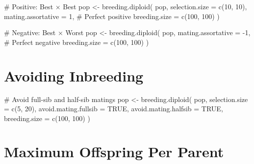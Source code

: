 \documentclass[
  letterpaper,
]{book}
\newenvironment{Shaded}{\begin{snugshade}}{\end{snugshade}}
\newcommand{\AttributeTok}[1]{\textcolor[rgb]{0.40,0.45,0.13}{#1}}
\newcommand{\CommentTok}[1]{\textcolor[rgb]{0.37,0.37,0.37}{#1}}
\newcommand{\ConstantTok}[1]{\textcolor[rgb]{0.56,0.35,0.01}{#1}}
\newcommand{\DecValTok}[1]{\textcolor[rgb]{0.68,0.00,0.00}{#1}}
\newcommand{\FunctionTok}[1]{\textcolor[rgb]{0.28,0.35,0.67}{#1}}
\newcommand{\NormalTok}[1]{\textcolor[rgb]{0.00,0.23,0.31}{#1}}
\newcommand{\OtherTok}[1]{\textcolor[rgb]{0.00,0.23,0.31}{#1}}
\newcommand{\SpecialCharTok}[1]{\textcolor[rgb]{0.37,0.37,0.37}{#1}}
\begin{document}
\begin{Shaded}
\begin{Highlighting}[]
\CommentTok{\# Positive: Best × Best}
\NormalTok{pop }\OtherTok{\textless{}{-}} \FunctionTok{breeding.diploid}\NormalTok{(}
\NormalTok{  pop,}
  \AttributeTok{selection.size =} \FunctionTok{c}\NormalTok{(}\DecValTok{10}\NormalTok{, }\DecValTok{10}\NormalTok{),}
  \AttributeTok{mating.assortative =} \DecValTok{1}\NormalTok{,        }\CommentTok{\# Perfect positive}
  \AttributeTok{breeding.size =} \FunctionTok{c}\NormalTok{(}\DecValTok{100}\NormalTok{, }\DecValTok{100}\NormalTok{)}
\NormalTok{)}

\CommentTok{\# Negative: Best × Worst}
\NormalTok{pop }\OtherTok{\textless{}{-}} \FunctionTok{breeding.diploid}\NormalTok{(}
\NormalTok{  pop,}
  \AttributeTok{mating.assortative =} \SpecialCharTok{{-}}\DecValTok{1}\NormalTok{,       }\CommentTok{\# Perfect negative}
  \AttributeTok{breeding.size =} \FunctionTok{c}\NormalTok{(}\DecValTok{100}\NormalTok{, }\DecValTok{100}\NormalTok{)}
\NormalTok{)}
\end{Highlighting}
\end{Shaded}

\section{Avoiding Inbreeding}\label{avoiding-inbreeding}

\begin{Shaded}
\begin{Highlighting}[]
\CommentTok{\# Avoid full{-}sib and half{-}sib matings}
\NormalTok{pop }\OtherTok{\textless{}{-}} \FunctionTok{breeding.diploid}\NormalTok{(}
\NormalTok{  pop,}
  \AttributeTok{selection.size =} \FunctionTok{c}\NormalTok{(}\DecValTok{5}\NormalTok{, }\DecValTok{20}\NormalTok{),}
  \AttributeTok{avoid.mating.fullsib =} \ConstantTok{TRUE}\NormalTok{,}
  \AttributeTok{avoid.mating.halfsib =} \ConstantTok{TRUE}\NormalTok{,}
  \AttributeTok{breeding.size =} \FunctionTok{c}\NormalTok{(}\DecValTok{100}\NormalTok{, }\DecValTok{100}\NormalTok{)}
\NormalTok{)}
\end{Highlighting}
\end{Shaded}

\section{Maximum Offspring Per
Parent}\label{maximum-offspring-per-parent}
\end{document}
